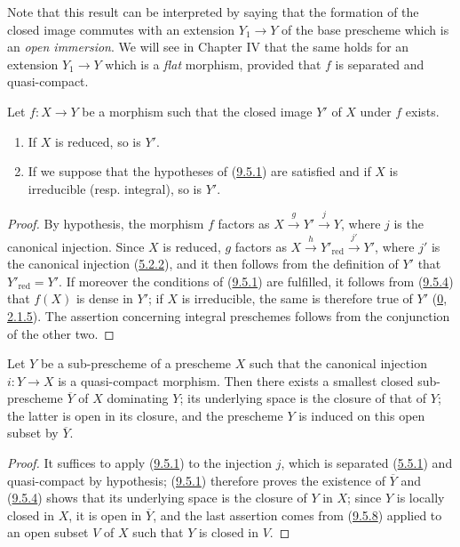 Note that this result can be interpreted by saying that the formation of
the closed image commutes with an extension $Y_1\to Y$ of the base
prescheme which is an \emph{open immersion}. We will see in Chapter IV that
the same holds for an extension $Y_1\to Y$ which is a \emph{flat} morphism,
provided that $f$ is separated and quasi-compact.

\begin{proposition}[9.5.9]
\label{I.9.5.9}
Let $f:X\to Y$ be a morphism such that the closed image $Y'$ of $X$ under
$f$ exists.
\begin{enumerate}
  \item[(i)] If $X$ is reduced, so is $Y'$.
  \item[(ii)] If we suppose that the hypotheses of
    (\hyperref[I.9.5.1]{9.5.1}) are satisfied and if $X$ is irreducible
    (resp. integral), so is $Y'$.
\end{enumerate}
\end{proposition}

\begin{proof}
By hypothesis, the morphism $f$ factors as
$X\xrightarrow{g}Y'\xrightarrow{j}Y$, where $j$ is the canonical injection.
Since $X$ is reduced, $g$ factors as
$X\xrightarrow{h}Y'_{\mathrm{red}}\xrightarrow{j'}Y'$, where $j'$ is
the canonical injection (\hyperref[I.5.2.2]{5.2.2}), and it then follows
from the definition of $Y'$ that $Y'_{\mathrm{red}}=Y'$. If moreover the
conditions of (\hyperref[I.9.5.1]{9.5.1}) are fulfilled, it follows from
(\hyperref[I.9.5.4]{9.5.4}) that $f(X)$ is dense in $Y'$; if $X$ is
irreducible, the same is therefore true of $Y'$
(\hyperref[0.2.1.5]{0, 2.1.5}). The assertion concerning integral
preschemes follows from the conjunction of the other two.
\end{proof}

\begin{proposition}[9.5.10]
\label{I.9.5.10}
Let $Y$ be a sub-prescheme of a prescheme $X$ such that the canonical
injection $i:Y\to X$ is a quasi-compact morphism. Then there exists a
smallest closed sub-prescheme $\overline{Y}$ of $X$ dominating $Y$; its
underlying space is the closure of that of $Y$; the latter is open in its
closure, and the prescheme $Y$ is induced on this open subset by
$\overline{Y}$.
\end{proposition}

\begin{proof}
It suffices to apply (\hyperref[I.9.5.1]{9.5.1}) to the injection $j$,
which is separated (\hyperref[I.5.5.1]{5.5.1}) and quasi-compact by
hypothesis; (\hyperref[I.9.5.1]{9.5.1}) therefore proves the existence of
$\overline{Y}$ and (\hyperref[I.9.5.4]{9.5.4}) shows that its underlying
space is the closure of $Y$ in $X$; since $Y$ is locally closed in $X$, it
is open in $\overline{Y}$, and the last assertion comes from
(\hyperref[I.9.5.8]{9.5.8}) applied to an open subset $V$ of $X$ such
that $Y$ is closed in $V$.
\end{proof}

